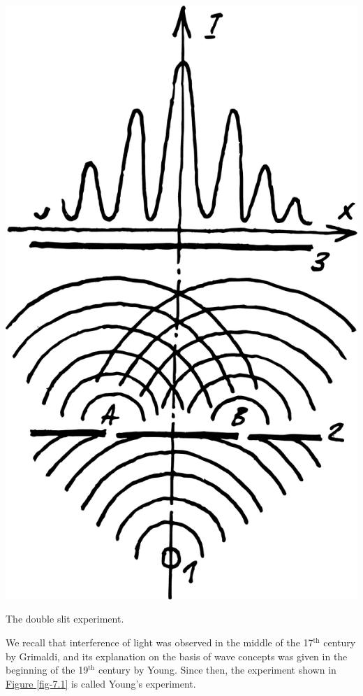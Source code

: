 \documentclass[a4paper,sfsidenotes,colorlinks=true]{tufte-book}
\numberwithin{equation}{section}
\numberwithin{figure}{section}
\begin{document}
\begin{marginfigure}
\centering
\includegraphics[width=\textwidth]{figures/fig-07-01.pdf}
\caption{The double slit experiment.}
\label{fig-7.1}
\end{marginfigure}

We recall that interference of light was observed in the middle of the 17$^{\mathrm{th}}$ century by Grimaldi, and its explanation on the basis of wave concepts was given in the beginning of the 19$^{\mathrm{th}}$ century by Young. Since then, the experiment shown in  \hyperref[fig-7.1]{Figure \ref{fig-7.1}} is called Young's experiment.
\end{document}
